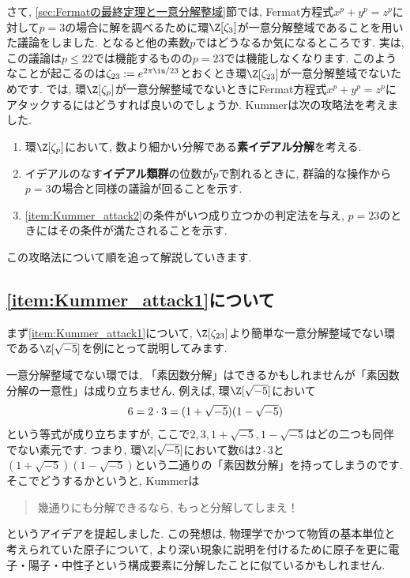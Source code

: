 \documentclass[11pt,b5paper,oneside,titlepage,lualatex]{ltjsreport}
\begin{document}
さて, \ref{sec:Fermatの最終定理と一意分解整域}節では, Fermat方程式$ x^p + y^p = z^p $に対して$ p=3 $の場合に解を調べるために環$ \Z[\zeta_3] $が一意分解整域であることを用いた議論をしました. 
となると他の素数$ p $ではどうなるか気になるところです. 
実は, この議論は$ p \le 22 $では機能するものの$ p = 23 $では機能しなくなります. 
このようなことが起こるのは$ \zeta_{23} := e^{2\pi\iu/23} $とおくとき環$ \Z[\zeta_{23}] $が一意分解整域でないためです. 
では, 環$ \Z[\zeta_p] $が一意分解整域でないときにFermat方程式$ x^p + y^p = z^p $にアタックするにはどうすれば良いのでしょうか. 
Kummerは次の攻略法を考えました. 
\begin{enumerate}
	\item \label{item:Kummer_attack1} 環$ \Z[\zeta_p] $において, 数より細かい分解である\textbf{素イデアル分解}を考える. 
	\item \label{item:Kummer_attack2} イデアルのなす\textbf{イデアル類群}の位数が$ p $で割れるときに, 群論的な操作から$ p=3 $の場合と同様の議論が回ることを示す. 
	\item \label{item:Kummer_attack3} \ref{item:Kummer_attack2}の条件がいつ成り立つかの判定法を与え, $ p=23 $のときにはその条件が満たされることを示す. 
\end{enumerate}
この攻略法について順を追って解説していきます. 


\subsection{\ref{item:Kummer_attack1}について}


まず\ref{item:Kummer_attack1}について, $ \Z[\zeta_{23}] $より簡単な一意分解整域でない環である$ \Z[\sqrt{-5}] $を例にとって説明してみます. 

一意分解整域でない環では, 「素因数分解」はできるかもしれませんが「素因数分解の一意性」は成り立ちません. 
例えば, 環$ \Z[\sqrt{-5}] $において
\begin{equation} \label{decomp_sqrt{-5}}
	6 = 2 \cdot 3 = (1 + \sqrt{-5}) (1 - \sqrt{-5})
\end{equation}
という等式が成り立ちますが, ここで$ 2, 3, 1 + \sqrt{-5}, 1 - \sqrt{-5} $はどの二つも同伴でない素元です. 
つまり, 環$ \Z[\sqrt{-5}] $において数$ 6 $は$ 2 \cdot 3 $と$ (1 + \sqrt{-5}) (1 - \sqrt{-5}) $という二通りの「素因数分解」を持ってしまうのです. 
そこでどうするかというと, Kummerは
\begin{quote}
	\centering
	幾通りにも分解できるなら, もっと分解してしまえ！
\end{quote}
というアイデアを提起しました. 
この発想は, 物理学でかつて物質の基本単位と考えられていた原子について, より深い現象に説明を付けるために原子を更に電子・陽子・中性子という構成要素に分解したことに似ているかもしれません. 
\end{document}
